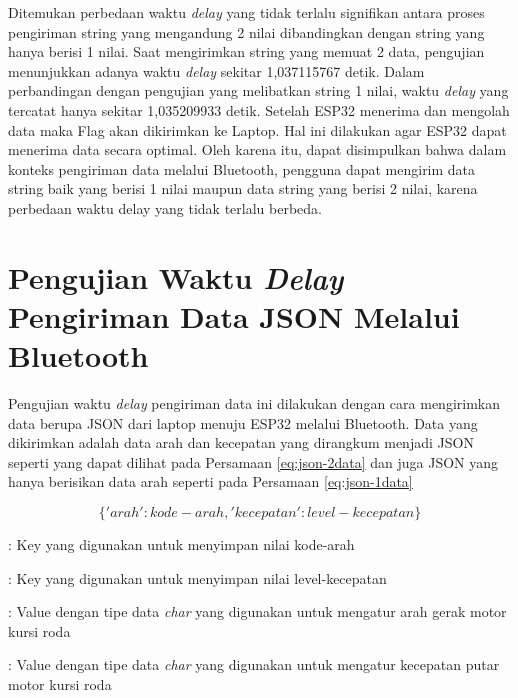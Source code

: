 Ditemukan perbedaan waktu \emph{delay} yang tidak terlalu signifikan antara proses pengiriman string yang mengandung 2 nilai dibandingkan dengan string yang hanya berisi 1 nilai. Saat mengirimkan string yang memuat 2 data, pengujian menunjukkan adanya waktu \emph{delay} sekitar 1,037115767 detik. Dalam perbandingan dengan pengujian yang melibatkan string 1 nilai, waktu \emph{delay} yang tercatat hanya sekitar 1,035209933 detik. Setelah ESP32 menerima dan mengolah data maka Flag akan dikirimkan ke Laptop. Hal ini dilakukan agar ESP32 dapat menerima data secara optimal. Oleh karena itu, dapat disimpulkan bahwa dalam konteks pengiriman data melalui Bluetooth, pengguna dapat mengirim data string baik yang berisi 1 nilai maupun data string yang berisi 2 nilai, karena perbedaan waktu delay yang tidak terlalu berbeda.

\newpage

\section{Pengujian Waktu \emph{Delay} Pengiriman Data JSON Melalui Bluetooth}
\label{sec:delayBluetoothJSON}

Pengujian waktu \emph{delay} pengiriman data ini dilakukan dengan cara mengirimkan data berupa JSON dari laptop menuju ESP32 melalui Bluetooth. Data yang dikirimkan adalah data arah dan kecepatan yang dirangkum menjadi JSON seperti yang dapat dilihat pada Persamaan \ref{eq:json-2data} dan juga JSON yang hanya berisikan data arah seperti pada Persamaan \ref{eq:json-1data}

\begin{equation}
  \label{eq:json-2data}
    \{'arah': kode-arah, 'kecepatan': level-kecepatan\}
\end{equation}

\begin{description}[nolistsep]
  \item[Keterangan]
  \item[arah] : Key yang digunakan untuk menyimpan nilai kode-arah
  \item[kecepatan] : Key yang digunakan untuk menyimpan nilai level-kecepatan
  \item[kode-arah] : Value dengan tipe data \emph{char} yang digunakan untuk mengatur arah gerak motor kursi roda
  \item[level-kecepatan] : Value dengan tipe data \emph{char} yang digunakan untuk mengatur kecepatan putar motor kursi roda 
\end{description}



